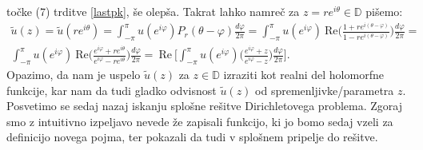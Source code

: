 \documentclass[mat1]{fmfdelo}
\begin{document}
    točke (7) trditve \ref{lastpk}, še olepša. Takrat lahko namreč za $z = re^{i\theta} \in \mathbb{D}$ pišemo:
    \begin{equation*}
        \begin{split}
            \widetilde{u}(z) = \widetilde{u}(r e^{i \theta}) = \int_{-\pi}^{\pi}{u(e^{i \varphi}) P_r(\theta - \varphi)\frac{d \varphi}{2 \pi}} = \int_{-\pi}^{\pi}{u(e^{i \varphi})~\text{Re}\bigg(\frac{1+re^{i(\theta - \varphi)}}{1-re^{i(\theta - \varphi)}}\bigg)\frac{d \varphi}{2 \pi}}= \\
            \int_{-\pi}^{\pi}{u(e^{i \varphi})~\text{Re}\bigg(\frac{e^{i\varphi}+re^{i\theta}}{e^{i\varphi}-re^{i\theta}}\bigg)\frac{d \varphi}{2 \pi}}=~\text{Re}~\bigg[\int_{-\pi}^{\pi}{u(e^{i \varphi})\bigg(\frac{e^{i\varphi}+z}{e^{i\varphi}-z}\bigg)\frac{d \varphi}{2 \pi}}\bigg].
        \end{split}
    \end{equation*}
    Opazimo, da nam je uspelo $\widetilde{u}(z)$ za $z \in \mathbb{D}$ izraziti kot realni del holomorfne funkcije, kar nam da tudi gladko odvisnost $\widetilde{u}(z)$ od spremenljivke/parametra $z$.
    \newline
    Posvetimo se sedaj nazaj iskanju splošne rešitve Dirichletovega problema. Zgoraj smo z intuitivno izpeljavo nevede že zapisali funkcijo, ki jo bomo sedaj vzeli za definicijo novega pojma, ter pokazali da tudi v splošnem pripelje do rešitve.
\end{document}
